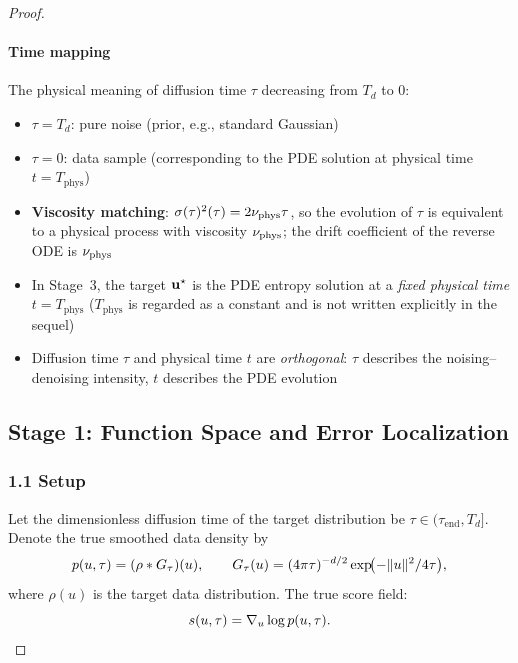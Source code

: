 \begin{proof}
\paragraph{Time mapping}
The physical meaning of diffusion time $\tau$ decreasing from $T_d$ to $0$:
\begin{itemize}
  \item $\tau = T_d$: pure noise (prior, e.g., standard Gaussian)
  \item $\tau = 0$: data sample (corresponding to the PDE solution at physical time $t = T_{\mathrm{phys}}$)
  \item \textbf{Viscosity matching}: $\sigma(\tau)^2(\tau) = 2\nu_{\mathrm{phys}} \tau$, so the evolution of $\tau$ is equivalent to a physical process with viscosity $\nu_{\mathrm{phys}}$; the drift coefficient of the reverse ODE is $\nu_{\mathrm{phys}}$
  \item In Stage~3, the target $\mathbf{u}^{\star}$ is the PDE entropy solution at a \emph{fixed physical time} $t = T_{\mathrm{phys}}$ ($T_{\mathrm{phys}}$ is regarded as a constant and is not written explicitly in the sequel)
  \item Diffusion time $\tau$ and physical time $t$ are \emph{orthogonal}: $\tau$ describes the noising--denoising intensity, $t$ describes the PDE evolution
\end{itemize}

\subsection{Stage 1: Function Space and Error Localization}\label{sec:stage1}

\subsubsection{1.1 Setup}

Let the dimensionless diffusion time of the target distribution be $\tau \in (\tau_{\mathrm{end}}, T_d]$. Denote the true smoothed data density by
\begin{equation}
  p(u, \tau) = (\rho \ast G_{\tau})(u), \qquad G_{\tau}(u) = (4\pi\tau)^{-d/2} \exp\!\bigl(-\lVert u \rVert^2/4\tau\bigr),
\end{equation}
where $\rho(u)$ is the target data distribution. The true score field:
\begin{equation}
  s(u, \tau) = \nabla_u \log p(u, \tau).
\end{equation}


\end{proof}
